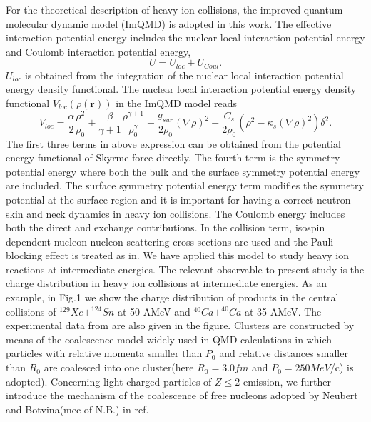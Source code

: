 \documentclass[aps,prc,groupedaddress,showpacs,manuscript]{revtex4}
\begin{document}
For the theoretical description of heavy ion collisions, the
improved quantum molecular dynamic model (ImQMD)\cite{Wa02,Wa04}
is adopted in this work. The effective interaction potential
energy includes the nuclear local interaction potential energy and
Coulomb interaction potential energy,
\begin{equation}
U=U_{loc}+U_{Coul}.  \label{11}
\end{equation}
$U_{loc}$ is obtained from the integration of the nuclear local
interaction potential energy density functional. The nuclear local
interaction potential energy density functional
$V_{loc}(\rho(\mathbf{r}))$ in the ImQMD model reads
\begin{equation}
V_{loc}=\frac{\alpha }{2}\frac{\rho ^{2}}{\rho _{0}}+\frac{\beta }{\gamma +1}%
\frac{\rho ^{\gamma +1}}{\rho _{0}^{\gamma }}+\frac{g_{sur}}{2\rho _{0}}%
(\nabla \rho )^{2}+\frac{C_{s}}{2\rho _{0}}(\rho ^{2}-\kappa
_{s}(\nabla \rho )^{2})\delta ^{2}. \label{13}
\end{equation}
The first three terms in above expression can be obtained from the
potential energy functional of Skyrme force directly. The fourth
term is the symmetry potential energy where both the bulk and the
surface symmetry potential energy are included. The surface
symmetry potential energy term modifies the symmetry potential at
the surface region and it is important for having a correct
neutron skin and neck dynamics in heavy ion collisions. The
Coulomb energy includes both the direct and exchange
contributions. In the collision term, isospin dependent
nucleon-nucleon scattering cross sections are used\cite{Cug96} and
the Pauli blocking effect is treated as in\cite{Li01}. We have
applied this model to study heavy ion reactions at intermediate
energies. The relevant observable to present study is the charge
distribution in heavy ion collisions at intermediate energies.  As
an example, in Fig.1 we show the charge distribution of products
in the central collisions of $^{129}Xe+^{124}Sn$ at 50 AMeV and
$^{40}Ca+^{40}Ca$ at 35 AMeV.  The experimental data from
\cite{Hud03,Hag94} are also given in the figure. Clusters are
constructed by means of the coalescence model widely used in QMD
calculations in which particles with relative momenta smaller than
$P_{0}$ and relative distances smaller than $R_{0}$ are coalesced
into one cluster(here $R_{0}=3.0fm$ and $P_{0}=250MeV$/c) is
adopted). Concerning light charged particles of $Z \leq 2$
emission, we further introduce the mechanism of the coalescence of
free nucleons adopted by Neubert and Botvina(mec of N.B.) in ref.
\end{document}
